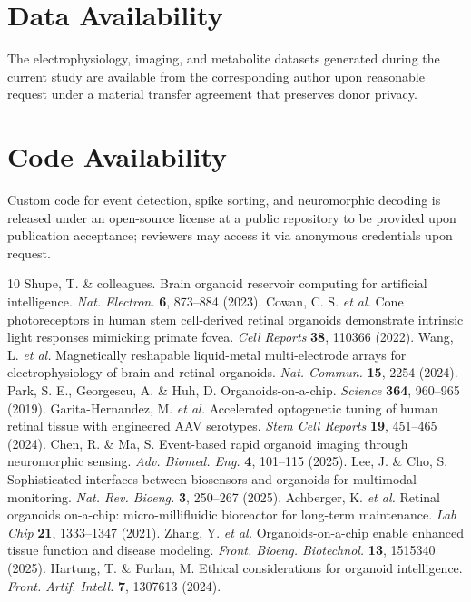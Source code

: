 \documentclass[11pt]{article}
\begin{document}
\section*{Data Availability}
The electrophysiology, imaging, and metabolite datasets generated during the current study are available from the corresponding author upon reasonable request under a material transfer agreement that preserves donor privacy.

\section*{Code Availability}
Custom code for event detection, spike sorting, and neuromorphic decoding is released under an open-source license at a public repository to be provided upon publication acceptance; reviewers may access it via anonymous credentials upon request.

\begin{thebibliography}{10}
 Shupe, T. \& colleagues. Brain organoid reservoir computing for artificial intelligence. \emph{Nat. Electron.} \textbf{6}, 873--884 (2023).
 Cowan, C. S. \emph{et al.} Cone photoreceptors in human stem cell-derived retinal organoids demonstrate intrinsic light responses mimicking primate fovea. \emph{Cell Reports} \textbf{38}, 110366 (2022).
 Wang, L. \emph{et al.} Magnetically reshapable liquid-metal multi-electrode arrays for electrophysiology of brain and retinal organoids. \emph{Nat. Commun.} \textbf{15}, 2254 (2024).
 Park, S. E., Georgescu, A. \& Huh, D. Organoids-on-a-chip. \emph{Science} \textbf{364}, 960--965 (2019).
 Garita-Hernandez, M. \emph{et al.} Accelerated optogenetic tuning of human retinal tissue with engineered AAV serotypes. \emph{Stem Cell Reports} \textbf{19}, 451--465 (2024).
 Chen, R. \& Ma, S. Event-based rapid organoid imaging through neuromorphic sensing. \emph{Adv. Biomed. Eng.} \textbf{4}, 101--115 (2025).
 Lee, J. \& Cho, S. Sophisticated interfaces between biosensors and organoids for multimodal monitoring. \emph{Nat. Rev. Bioeng.} \textbf{3}, 250--267 (2025).
 Achberger, K. \emph{et al.} Retinal organoids on-a-chip: micro-millifluidic bioreactor for long-term maintenance. \emph{Lab Chip} \textbf{21}, 1333--1347 (2021).
 Zhang, Y. \emph{et al.} Organoids-on-a-chip enable enhanced tissue function and disease modeling. \emph{Front. Bioeng. Biotechnol.} \textbf{13}, 1515340 (2025).
 Hartung, T. \& Furlan, M. Ethical considerations for organoid intelligence. \emph{Front. Artif. Intell.} \textbf{7}, 1307613 (2024).
\end{thebibliography}
\end{document}
